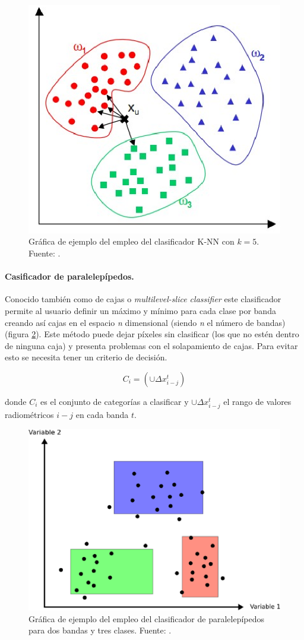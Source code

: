 \begin{figure}
	\centering
	\includegraphics[width=0.6\linewidth]{./Imagenes/KNN.eps}
	\caption[Clasificador \textit{K-Nearest Neighbor}]{Gráfica de ejemplo del empleo del clasificador K-NN con $k=5$. Fuente: \cite{JARS1999}.}
	\label{fig:KNN}
\end{figure}

\paragraph{Casificador de paralelepípedos.}
Conocido también como de cajas o \textit{multilevel-slice classifier} este clasificador permite al usuario definir un máximo y mínimo para cada clase por banda creando así cajas en el espacio \textit{n} dimensional (siendo \textit{n} el número de bandas) (figura \ref{fig:paralele}). Este método puede dejar píxeles sin clasificar (los que no estén dentro de ninguna caja) y presenta problemas con el solapamiento de cajas. Para evitar esto se necesita tener un criterio de decisión.

\begin{equation}
C_{i}=(\cup\Delta x^{t}_{i-j})
\end{equation}

\noindent donde $C_{i}$ es el conjunto de categorías a clasificar y $\cup\Delta x^{t}_{i-j}$ el rango de valores radiométricos $i-j$ en cada banda $t$.

\begin{figure}
	\centering
	\includegraphics[width=0.6\linewidth]{./Imagenes/Paralelepipedos.eps}
	\caption[Clasificador de paralelepípedos]{Gráfica de ejemplo del empleo del clasificador de paralelepípedos para dos bandas y tres clases. Fuente: \cite{Olaya2010}.}
	\label{fig:paralele}	
\end{figure}

